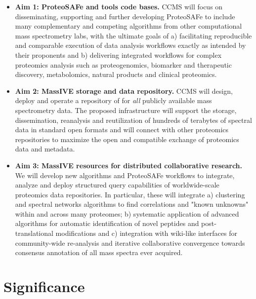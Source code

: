 \documentclass[arial,11pt]{article}
\begin{document}
\begin{itemize}
    \item {\bf Aim 1: ProteoSAFe and tools code bases.} CCMS will focus on disseminating, supporting and further developing ProteoSAFe to include many complementary and competing algorithms from other computational mass spectrometry labs, with the ultimate goals of a) facilitating reproducible and comparable execution of data analysis workflows exactly as intended by their proponents and b) delivering integrated workflows for complex proteomics analysis such as proteogenomics, biomarker and therapeutic discovery, metabolomics, natural products and clinical proteomics.

    \item {\bf Aim 2: MassIVE storage and data repository.} CCMS will design, deploy and operate a repository of for {\em all} publicly available mass spectrometry data. The proposed infrastructure will support the storage, dissemination, reanalysis and reutilization of hundreds of terabytes of spectral data in standard open formats and will connect with other proteomics repositories to maximize the open and compatible exchange of proteomics data and metadata.

    \item {\bf Aim 3: MassIVE resources for distributed collaborative research.} We will develop new algorithms and ProteoSAFe workflows to integrate, analyze and deploy structured query capabilities of worldwide-scale proteomics data repositories. In particular, these will integrate a) clustering and spectral networks algorithms to find correlations and "known unknowns" within and across many proteomes; b) systematic application of advanced algorithms for automatic identification of novel peptides and post-translational modifications and c) integration with wiki-like interfaces for community-wide re-analysis and iterative collaborative convergence towards consensus annotation of all mass spectra ever acquired.
\end{itemize}

\section{Significance}

\end{document}
